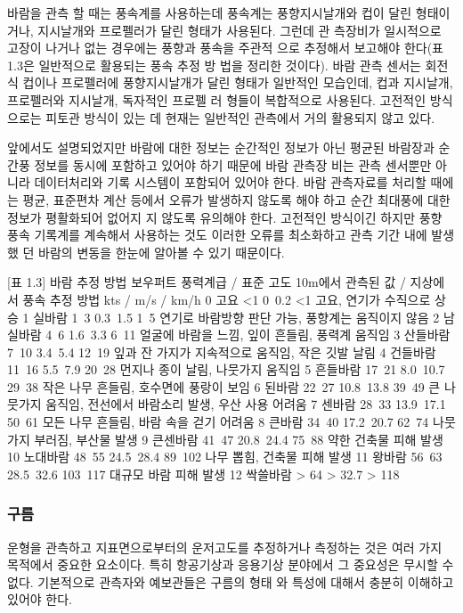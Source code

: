 바람을 관측 할 때는 풍속계를 사용하는데 풍속계는 풍향지시날개와 컵이
달린 형태이거나, 지시날개와 프로펠러가 달린 형태가 사용된다. 그런데 관
측장비가 일시적으로 고장이 나거나 없는 경우에는 풍향과 풍속을 주관적
으로 추정해서 보고해야 한다(표 1.3은 일반적으로 활용되는 풍속 추정 방
법을 정리한 것이다).
바람 관측 센서는 회전식 컵이나 프로펠러에 풍향지시날개가 달린 형태가
일반적인 모습인데, 컵과 지시날개, 프로펠러와 지시날개, 독자적인 프로펠
러 형들이 복합적으로 사용된다. 고전적인 방식으로는 피토관 방식이 있는
데 현재는 일반적인 관측에서 거의 활용되지 않고 있다.

앞에서도 설명되었지만 바람에 대한 정보는 순간적인 정보가 아닌 평균된
바람장과 순간풍 정보를 동시에 포함하고 있어야 하기 때문에 바람 관측장
비는 관측 센서뿐만 아니라 데이터처리와 기록 시스템이 포함되어 있어야
한다. 바람 관측자료를 처리할 때에는 평균, 표준편차 계산 등에서 오류가
발생하지 않도록 해야 하고 순간 최대풍에 대한 정보가 평활화되어 없어지
지 않도록 유의해야 한다. 고전적인 방식이긴 하지만 풍향 풍속 기록계를
계속해서 사용하는 것도 이러한 오류를 최소화하고 관측 기간 내에 발생했
던 바람의 변동을 한눈에 알아볼 수 있기 때문이다.


[표 1.3] 바람 추정 방법
보우퍼트 풍력계급 / 표준 고도 10m에서 관측된 값 / 지상에서 풍속 추정 방법
				kts /  m/s /  km/h
0 고요 <1 0~0.2 <1 고요, 연기가 수직으로 상승
1 실바람 1~3 0.3~1.5 1~5  연기로 바람방향 판단 가능, 풍향계는 움직이지 않음
2 남실바람 4~6 1.6~3.3 6~11  얼굴에 바람을 느낌, 잎이 흔들림, 풍력계 움직임 
3 산들바람 7~10 3.4~5.4 12~19 잎과 잔 가지가 지속적으로 움직임, 작은 깃발 날림
4 건들바람 11~16 5.5~7.9 20~28 먼지나 종이 날림, 나뭇가지 움직임
5 흔들바람 17~21 8.0~10.7 29~38 작은 나무 흔들림, 호수면에 풍랑이 보임
6 된바람 22~27 10.8~13.8 39~49 큰 나뭇가지 움직임, 전선에서 바람소리 발생, 우산 사용 어려움
7 센바람 28~33 13.9~17.1 50~61 모든 나무 흔들림, 바람 속을 걷기 어려움
8 큰바람 34~40 17.2~20.7 62~74 나뭇가지 부러짐, 부산물 발생
9 큰센바람 41~47 20.8~24.4 75~88 약한 건축물 피해 발생
10 노대바람 48~55 24.5~28.4 89~102 나무 뽑힘, 건축물 피해 발생
11 왕바람 56~63 28.5~32.6 103~117 대규모 바람 피해 발생
12 싹쓸바람 > 64 > 32.7 > 118


\subsubsection{구름}

운형을 관측하고 지표면으로부터의 운저고도를 추정하거나 측정하는 것은
여러 가지 목적에서 중요한 요소이다. 특히 항공기상과 응용기상 분야에서
그 중요성은 무시할 수 없다. 기본적으로 관측자와 예보관들은 구름의 형태
와 특성에 대해서 충분히 이해하고 있어야 한다.

